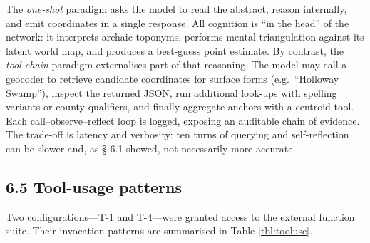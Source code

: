 \documentclass[
  10pt]{article}
\begin{document}
The \emph{one-shot} paradigm asks the model to read the abstract, reason
internally, and emit coordinates in a single response. All cognition is
``in the head'' of the network: it interprets archaic toponyms, performs
mental triangulation against its latent world map, and produces a
best-guess point estimate. By contrast, the \emph{tool-chain} paradigm
externalises part of that reasoning. The model may call a geocoder to
retrieve candidate coordinates for surface forms (e.g.~``Holloway
Swamp''), inspect the returned JSON, run additional look-ups with
spelling variants or county qualifiers, and finally aggregate anchors
with a centroid tool. Each call--observe--reflect loop is logged,
exposing an auditable chain of evidence. The trade-off is latency and
verbosity: ten turns of querying and self-reflection can be slower and,
as § 6.1 showed, not necessarily more accurate.

\subsection{6.5 Tool-usage patterns}\label{tool-usage-patterns}

Two configurations---T-1 and T-4---were granted access to the external
function suite. Their invocation patterns are summarised in Table
\ref{tbl:tooluse}.
\end{document}
